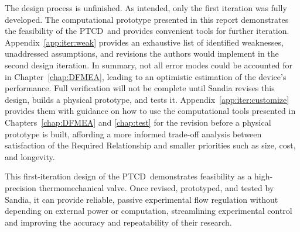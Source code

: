 \documentclass[12pt, letterpaper]{report}%
\newcommand{\device}{PTCD}
\begin{document}
	The design process is unfinished. As intended, only the first iteration was fully developed.
	The computational prototype presented in this report demonstrates the feasibility of the \device\ and provides convenient tools for further iteration.
	Appendix~\ref{app:iter:weak} provides an exhaustive list of identified weaknesses, unaddressed assumptions, and revisions the authors would implement in the second design iteration.
	In summary, not all error modes could be accounted for in Chapter~\ref{chap:DFMEA},
	leading to an optimistic estimation of the device's performance. Full verification will not be complete until Sandia revises this design, builds a physical prototype, and tests it.
	Appendix~\ref{app:iter:customize} provides them with guidance on how to use the computational tools presented in Chapters~\ref{chap:DFMEA} and \ref{chap:test} for the revision before a physical prototype is built,
	affording a more informed trade-off analysis between satisfaction of the Required Relationship and smaller priorities such as size, cost, and longevity.

	This first-iteration design of the \device\ demonstrates feasibility as a high-precision thermomechanical valve. Once revised, prototyped, and tested by Sandia, it can provide reliable, passive experimental flow regulation without depending on external power or computation,
	streamlining experimental control and improving the accuracy and repeatability of their research.


\end{document}
